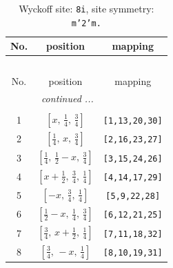 \documentclass[fleqn,8pt]{jsarticle}
\begin{document}
\begin{longtable}{ccc}
\caption{Wyckoff site: {\tt 8i}, site symmetry: {\tt m'2'm.}}
 \\
 \hline \hline
No. & position & mapping \\ \hline \endfirsthead

\multicolumn{2}{l}{\tablename\ \thetable{}} \\
 \hline \hline
No. & position & mapping \\ \hline \endhead

 \hline \hline
\multicolumn{2}{r}{\footnotesize\it continued ...} \\ \endfoot

 \hline \hline
\multicolumn{2}{r}{} \\ \endlastfoot

1 & $\left[ x,\, \frac{1}{4},\, \frac{3}{4} \right]$ & {\tt [1,13,20,30]} \\ \hline
2 & $\left[ \frac{1}{4},\, x,\, \frac{3}{4} \right]$ & {\tt [2,16,23,27]} \\ \hline
3 & $\left[ \frac{1}{4},\, \frac{1}{2} - x,\, \frac{3}{4} \right]$ & {\tt [3,15,24,26]} \\ \hline
4 & $\left[ x + \frac{1}{2},\, \frac{3}{4},\, \frac{1}{4} \right]$ & {\tt [4,14,17,29]} \\ \hline
5 & $\left[ - x,\, \frac{3}{4},\, \frac{1}{4} \right]$ & {\tt [5,9,22,28]} \\ \hline
6 & $\left[ \frac{1}{2} - x,\, \frac{1}{4},\, \frac{3}{4} \right]$ & {\tt [6,12,21,25]} \\ \hline
7 & $\left[ \frac{3}{4},\, x + \frac{1}{2},\, \frac{1}{4} \right]$ & {\tt [7,11,18,32]} \\ \hline
8 & $\left[ \frac{3}{4},\, - x,\, \frac{1}{4} \right]$ & {\tt [8,10,19,31]} \\
\end{longtable}
\renewcommand{\arraystretch}{1.2}
\end{document}
